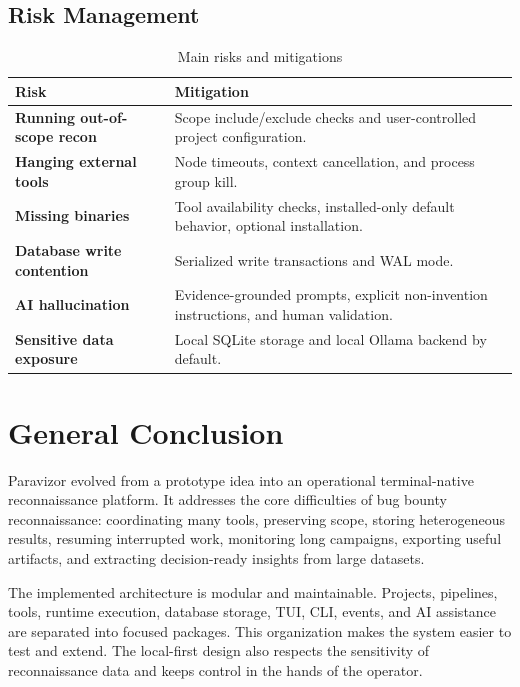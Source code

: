 \documentclass[a4paper,12pt]{article}
\begin{document}
\subsection{Risk Management}

\begin{table}[H]
    \centering
    \begin{tabularx}{\textwidth}{>{\bfseries}p{4cm}X}
        \toprule
        Risk & Mitigation \\
        \midrule
        Running out-of-scope recon & Scope include/exclude checks and user-controlled project configuration. \\
        Hanging external tools & Node timeouts, context cancellation, and process group kill. \\
        Missing binaries & Tool availability checks, installed-only default behavior, optional installation. \\
        Database write contention & Serialized write transactions and WAL mode. \\
        AI hallucination & Evidence-grounded prompts, explicit non-invention instructions, and human validation. \\
        Sensitive data exposure & Local SQLite storage and local Ollama backend by default. \\
        \bottomrule
    \end{tabularx}
    \caption{Main risks and mitigations}
    \label{tab:risks}
\end{table}

\newpage

\section*{General Conclusion}

Paravizor evolved from a prototype idea into an operational terminal-native reconnaissance platform. It addresses the core difficulties of bug bounty reconnaissance: coordinating many tools, preserving scope, storing heterogeneous results, resuming interrupted work, monitoring long campaigns, exporting useful artifacts, and extracting decision-ready insights from large datasets.

The implemented architecture is modular and maintainable. Projects, pipelines, tools, runtime execution, database storage, TUI, CLI, events, and AI assistance are separated into focused packages. This organization makes the system easier to test and extend. The local-first design also respects the sensitivity of reconnaissance data and keeps control in the hands of the operator.
\end{document}
